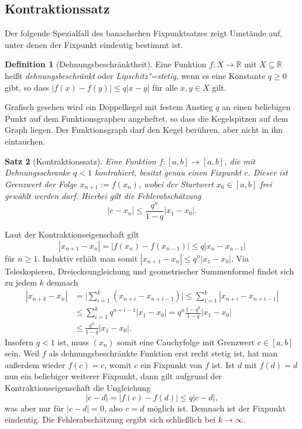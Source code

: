 \documentclass[
  a4paper, 10pt, fleqn, twoside, twocolumn,
  abstract=true
]{scrartcl}
\makeatletter
\renewenvironment{proof}[1][\proofname]{\par
  \normalfont\topsep2\p@\@plus2\p@\relax
  \trivlist
  \item[\hskip\labelsep\bfseries #1\@addpunct{.}]\ignorespaces
}{\endtrivlist\@endpefalse}
\theoremstyle{plain}
\newtheorem{theorem}{Satz}[section]
\theoremstyle{definition}
\newtheorem{definition}[theorem]{Definition}
\newcommand{\R}{\mathbb R}
\makeatother
\begin{document}
\subsection{Kontraktionssatz}

Der folgende Spezialfall des banachschen Fixpunktsatzes zeigt Umstände
auf, unter denen der Fixpunkt eindeutig bestimmt ist.

\begin{definition}[Dehnungsbeschränktheit]
Eine Funktion $f\colon X\to\R$ mit $X\subseteq\R$ heißt
\emph{dehnungsbeschränkt} oder \emph{Lipschitz"=stetig}, wenn es eine
Konstante $q\ge 0$ gibt, so dass $|f(x)-f(y)| \le q|x-y|$ für alle
$x,y\in X$ gilt.
\end{definition}

\noindent
Grafisch gesehen wird ein Doppelkegel mit festem Anstieg $q$ an einen
beliebigen Punkt auf dem Funktionsgraphen angeheftet, so dass die
Kegelspitzen auf dem Graph liegen. Der Funktionsgraph darf den Kegel
berühren, aber nicht in ihn eintauchen.

\begin{theorem}[Kontraktionssatz]
Eine Funktion $f\colon [a,b]\to [a,b]$, die mit Dehnungsschranke $q<1$
kontrahiert, besitzt genau einen Fixpunkt $c$. Dieser ist Grenzwert
der Folge $x_{n+1} := f(x_n)$, wobei der Startwert $x_0\in [a,b]$ frei
gewählt werden darf. Hierbei gilt die Fehlerabschätzung
\[|c-x_n| \le \frac{q^n}{1-q}|x_1-x_0|.\]
\end{theorem}

\begin{proof}
Laut der Kontraktionseigenschaft gilt
\[|x_{n+1}-x_n| = |f(x_n)-f(x_{n-1})| \le q|x_n-x_{n-1}|\]
für $n\ge 1$. Induktiv erhält man somit $|x_{n+1}-x_n|\le q^n|x_1-x_0|$.
Via Teleskopieren, Dreiecksungleichung und geometrischer Summenformel
findet sich zu jedem $k$ demnach
\begin{align*}
|x_{n+k}-x_n| &= \bigg|\sum_{i=1}^k (x_{n+i}-x_{n+i-1})\bigg|
\le \sum_{i=1}^k |x_{n+i}-x_{n+i-1}|\\
&\le \sum_{i=1}^k q^{n+i-1}|x_1-x_0|
= q^n\frac{1-q^k}{1-q}|x_1-x_0|\\
&\le \frac{q^n}{1-q}|x_1-x_0|.
\end{align*}
Insofern $q<1$ ist, muss $(x_n)$ somit eine Cauchyfolge mit Grenzwert
$c\in [a,b]$ sein. Weil $f$ als dehnungsbeschränkte Funktion erst
recht stetig ist, hat man außerdem wieder $f(c)=c$, womit $c$ ein
Fixpunkt von $f$ ist. Ist $d$ mit $f(d)=d$ nun ein beliebiger weiterer
Fixpunkt, dann gilt aufgrund der Kontraktionseigenschaft die Ungleichung
\[|c-d| = |f(c)-f(d)|\le q|c-d|,\]
was aber nur für $|c-d|=0$, also $c=d$ möglich ist. Demnach ist der
Fixpunkt eindeutig. Die Fehlerabschätzung ergibt sich schließlich bei
$k\to\infty$.\,\qedsymbol
\end{proof}
\end{document}
